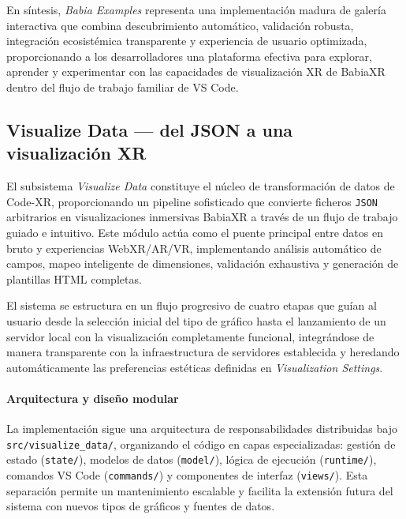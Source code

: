 \documentclass[a4paper, 12pt]{book}
\begin{document}
En síntesis, \emph{Babia Examples} representa una implementación madura de galería interactiva que combina descubrimiento automático, validación robusta, integración ecosistémica transparente y experiencia de usuario optimizada, proporcionando a los desarrolladores una plataforma efectiva para explorar, aprender y experimentar con las capacidades de visualización XR de BabiaXR dentro del flujo de trabajo familiar de VS Code.


\subsection{Visualize Data — del JSON a una visualización XR}
\label{sec:visualize-data}

El subsistema \emph{Visualize Data} constituye el núcleo de transformación de datos de Code-XR, proporcionando un pipeline sofisticado que convierte ficheros \texttt{JSON} arbitrarios en visualizaciones inmersivas BabiaXR a través de un flujo de trabajo guiado e intuitivo. Este módulo actúa como el puente principal entre datos en bruto y experiencias WebXR/AR/VR, implementando análisis automático de campos, mapeo inteligente de dimensiones, validación exhaustiva y generación de plantillas HTML completas.

El sistema se estructura en un flujo progresivo de cuatro etapas que guían al usuario desde la selección inicial del tipo de gráfico hasta el lanzamiento de un servidor local con la visualización completamente funcional, integrándose de manera transparente con la infraestructura de servidores establecida y heredando automáticamente las preferencias estéticas definidas en \emph{Visualization Settings}.

\paragraph{Arquitectura y diseño modular}
La implementación sigue una arquitectura de responsabilidades distribuidas bajo \texttt{src/visualize\_data/}, organizando el código en capas especializadas: gestión de estado (\texttt{state/}), modelos de datos (\texttt{model/}), lógica de ejecución (\texttt{runtime/}), comandos VS Code (\texttt{commands/}) y componentes de interfaz (\texttt{views/}). Esta separación permite un mantenimiento escalable y facilita la extensión futura del sistema con nuevos tipos de gráficos y fuentes de datos.
\end{document}
